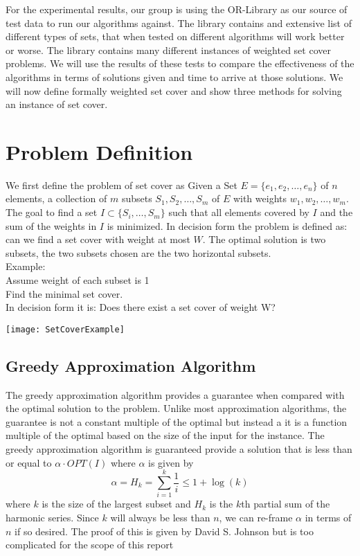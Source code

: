 For the experimental results, our group is using the OR-Library as our source of test data to run our algorithms against. The library contains and extensive list of different types of sets, that when tested on different algorithms will work better or worse. The library contains many different instances of weighted set cover problems. We will use the results of these tests to compare the effectiveness of the algorithms in terms of solutions given and time to arrive at those solutions. We will now define formally weighted set cover and show three methods for solving an instance of set cover.

\chapter{Problem Definition}
We first define the problem of set cover as Given a Set $E = \{e_1, e_2, \ldots ,e_n\}$ of $n$ elements, a collection of $m$ subsets $S_1, S_2, \ldots ,S_m$ of $E$ with weights $w_1, w_2, \ldots, w_m$. The goal to find a set $I \subset \{S_i, \ldots, S_m\}$ such that all elements covered by $I$ and the sum of the weights in $I$ is minimized. In decision form the problem is defined as: can we find a set cover with weight at most $W$. The optimal solution is two subsets, the two subsets chosen are the two horizontal subsets.\\
Example:\\
Assume weight of each subset is 1\\
Find the minimal set cover.\\
In decision form it is: Does there exist a set cover of weight W?

\texttt{[image: SetCoverExample]}

\section{Greedy Approximation Algorithm}
The greedy approximation algorithm provides a guarantee when compared with the optimal solution to the problem. Unlike most approximation algorithms, the guarantee is not a constant multiple of the optimal but instead a it is a function multiple of the optimal based on the size of the input for the instance. The greedy approximation algorithm is guaranteed provide a solution that is less than or equal to $\alpha \cdot OPT(I)$ where $\alpha$ is given by $$\alpha = H_k = \sum_{i=1}^k \frac{1}{i}\leq 1+\log(k)$$ where $k$ is the size of the largest subset and $H_k$ is the $k$th partial sum of the harmonic series. Since $k$ will always be less than $n$, we can re-frame $\alpha$ in terms of $n$ if so desired. The proof of this is given by David S. Johnson but is too complicated for the scope of this report %


